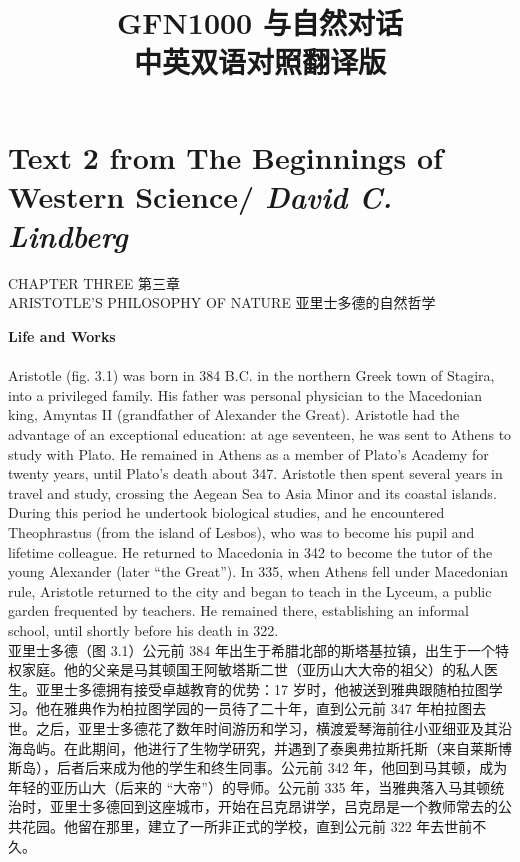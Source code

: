 \documentclass{article}
\begin{document}
\title{\textbf{
GFN1000 与自然对话\\
中英双语对照翻译版
}} %
\date{}
\maketitle %

\setcounter{secnumdepth}{0} %
\tableofcontents
\newpage

\section{Text 2 from The Beginnings of Western Science/ \textit{David C. Lindberg}}
\begin{center}
CHAPTER THREE 第三章\\
ARISTOTLE'S PHILOSOPHY OF NATURE 亚里士多德的自然哲学\\
\end{center}
\textbf{Life and Works}\\
\\
Aristotle (fig. 3.1) was born in 384 B.C. in the northern Greek town of Stagira, into a privileged family. His father was personal physician to the Macedonian king, Amyntas II (grandfather of Alexander the Great). Aristotle had the advantage of an exceptional education: at age seventeen, he was sent to Athens to study with Plato. He remained in Athens as a member of Plato’s Academy for twenty years, until Plato’s death about 347. Aristotle then spent several years in travel and study, crossing the Aegean Sea to Asia Minor and its coastal islands. During this period he undertook biological studies, and he encountered Theophrastus (from the island of Lesbos), who was to become his pupil and lifetime colleague. He returned to Macedonia in 342 to become the tutor of the young Alexander (later “the Great”). In 335, when Athens fell under Macedonian rule, Aristotle returned to the city and began to teach in the Lyceum, a public garden frequented by teachers. He remained there, establishing an informal school, until shortly before his death in 322.\\
亚里士多德（图 3.1）公元前 384 年出生于希腊北部的斯塔基拉镇，出生于一个特权家庭。他的父亲是马其顿国王阿敏塔斯二世（亚历山大大帝的祖父）的私人医生。亚里士多德拥有接受卓越教育的优势：17 岁时，他被送到雅典跟随柏拉图学习。他在雅典作为柏拉图学园的一员待了二十年，直到公元前 347 年柏拉图去世。之后，亚里士多德花了数年时间游历和学习，横渡爱琴海前往小亚细亚及其沿海岛屿。在此期间，他进行了生物学研究，并遇到了泰奥弗拉斯托斯（来自莱斯博斯岛），后者后来成为他的学生和终生同事。公元前 342 年，他回到马其顿，成为年轻的亚历山大（后来的 “大帝”）的导师。公元前 335 年，当雅典落入马其顿统治时，亚里士多德回到这座城市，开始在吕克昂讲学，吕克昂是一个教师常去的公共花园。他留在那里，建立了一所非正式的学校，直到公元前 322 年去世前不久。\\
\end{document}
